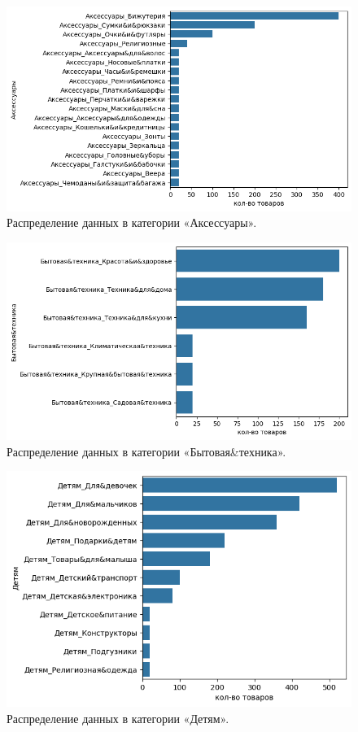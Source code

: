 \documentclass[a4paper,12pt]{extarticle}
\begin{document}
\begin{figure}[hbtp]
	\centering
	\includegraphics[scale=0.8]{приложения/amount_of_category_Аксессуары.png}
	\caption{Распределение данных в категории «Аксессуары».}
	\label{fig:amount_of_category_Аксессуары}
\end{figure}

\begin{figure}[hbtp]
	\centering
	\includegraphics[scale=0.8]{приложения/amount_of_category_Бытовая&техника.png}
	\caption{Распределение данных в категории «Бытовая\&техника».}
	\label{fig:amount_of_category_Бытовая&техника}
\end{figure}

\begin{figure}[hbtp]
	\centering
	\includegraphics[scale=0.8]{приложения/amount_of_category_Детям.png}
	\caption{Распределение данных в категории «Детям».}
	\label{fig:amount_of_category_Детям}
\end{figure}
\end{document}
